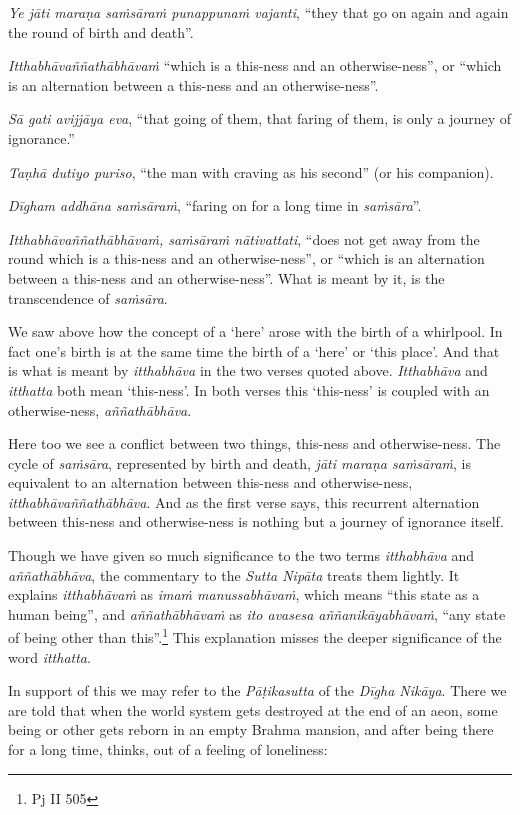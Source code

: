\emph{Ye jāti maraṇa saṁsāraṁ punappunaṁ vajanti}, ``they that go on again and again the round of birth and death''.

\enlargethispage{\baselineskip}

\emph{Itthabhāvaññathābhāvaṁ} ``which is a this-ness and an otherwise-ness'', or ``which is an alternation between a this-ness and an otherwise-ness''.

\emph{Sā gati avijjāya eva}, ``that going of them, that faring of them, is only a journey of ignorance.''

\emph{Taṇhā dutiyo puriso}, ``the man with craving as his second'' (or his companion).

\emph{Dīgham addhāna saṁsāraṁ}, ``faring on for a long time in \emph{saṁsāra}''.

\emph{Itthabhāvaññathābhāvaṁ, saṁsāraṁ nātivattati}, ``does not get away from the round which is a this-ness and an otherwise-ness'', or ``which is an alternation between a this-ness and an otherwise-ness''. What is meant by it, is the transcendence of \emph{saṁsāra}.

We saw above how the concept of a `here' arose with the birth of a whirlpool. In fact one's birth is at the same time the birth of a `here' or `this place'. And that is what is meant by \emph{itthabhāva} in the two verses quoted above. \emph{Itthabhāva} and \emph{itthatta} both mean `this-ness'. In both verses this `this-ness' is coupled with an otherwise-ness, \emph{aññathābhāva}.

Here too we see a conflict between two things, this-ness and otherwise-ness. The cycle of \emph{saṁsāra}, represented by birth and death, \emph{jāti maraṇa saṁsāraṁ}, is equivalent to an alternation between this-ness and otherwise-ness, \emph{itthabhāvaññathābhāva}. And as the first verse says, this recurrent alternation between this-ness and otherwise-ness is nothing but a journey of ignorance itself.

Though we have given so much significance to the two terms \emph{itthabhāva} and \emph{aññathābhāva}, the commentary to the \emph{Sutta Nipāta} treats them lightly. It explains \emph{itthabhāvaṁ} as \emph{imaṁ manussabhāvaṁ}, which means ``this state as a human being'', and \emph{aññathābhāvaṁ} as \emph{ito avasesa aññanikāyabhāvaṁ}, ``any state of being other than this''.\footnote{Pj II 505} This explanation misses the deeper significance of the word \emph{itthatta}.

In support of this we may refer to the \emph{Pāṭikasutta} of the \emph{Dīgha Nikāya}. There we are told that when the world system gets destroyed at the end of an aeon, some being or other gets reborn in an empty Brahma mansion, and after being there for a long time, thinks, out of a feeling of loneliness:


